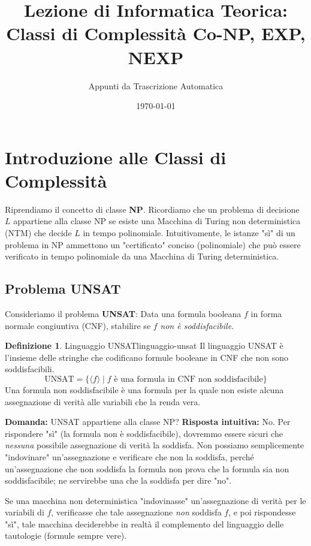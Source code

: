 \documentclass[a4paper]{article}
\title{Lezione di Informatica Teorica: \\ Classi di Complessità Co-NP, EXP, NEXP}
\author{Appunti da Trascrizione Automatica}
\date{\today}
\theoremstyle{definition} %
\newtheorem{definition}{Definizione}
\begin{document}
\maketitle
\tableofcontents
\newpage

\section{Introduzione alle Classi di Complessità}

Riprendiamo il concetto di classe \textbf{NP}. Ricordiamo che un problema di decisione $L$ appartiene alla classe NP se esiste una Macchina di Turing non deterministica (NTM) che decide $L$ in tempo polinomiale. Intuitivamente, le istanze "sì" di un problema in NP ammettono un "certificato" conciso (polinomiale) che può essere verificato in tempo polinomiale da una Macchina di Turing deterministica.

\subsection{Problema UNSAT}

Consideriamo il problema \textbf{UNSAT}:
Data una formula booleana $f$ in forma normale congiuntiva (CNF), stabilire se $f$ \textit{non è soddisfacibile}.

\begin{definition}{Linguaggio UNSAT}{linguaggio-unsat}
Il linguaggio UNSAT è l'insieme delle stringhe che codificano formule booleane in CNF che non sono soddisfacibili.
\[
\text{UNSAT} = \{ \langle f \rangle \mid f \text{ è una formula in CNF non soddisfacibile} \}
\]
Una formula non soddisfacibile è una formula per la quale non esiste alcuna assegnazione di verità alle variabili che la renda vera.
\end{definition}

\textbf{Domanda:} UNSAT appartiene alla classe NP?
\textbf{Risposta intuitiva:} No. Per rispondere "sì" (la formula non è soddisfacibile), dovremmo essere sicuri che \textit{nessuna} possibile assegnazione di verità la soddisfa. Non possiamo semplicemente "indovinare" un'assegnazione e verificare che non la soddisfa, perché un'assegnazione che non soddisfa la formula non prova che la formula sia non soddisfacibile; ne servirebbe una che la soddisfa per dire "no".

Se una macchina non deterministica "indovinasse" un'assegnazione di verità per le variabili di $f$, verificasse che tale assegnazione \textit{non} soddisfa $f$, e poi rispondesse "sì", tale macchina deciderebbe in realtà il complemento del linguaggio delle tautologie (formule sempre vere).
\end{document}
